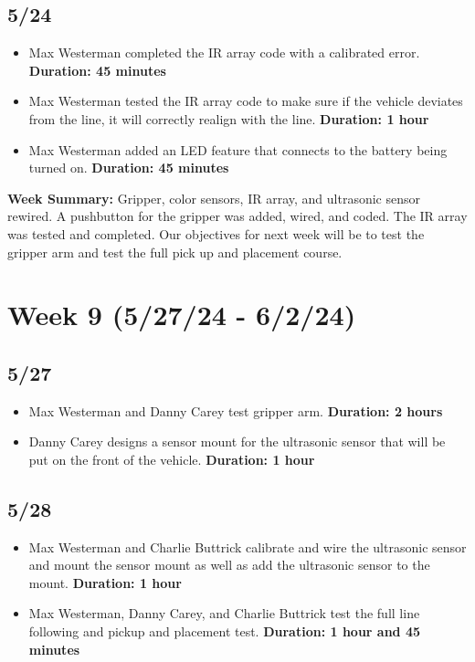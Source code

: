 \documentclass[12pt]{report}
\begin{document}
\subsection*{5/24}

\begin{itemize}
    \item Max Westerman completed the \gls{IR} array code with a calibrated error. \textbf{Duration: 45 minutes}
    \item Max Westerman tested the \gls{IR} array code to make sure if the vehicle deviates from the line, it will correctly realign with the line. \textbf{Duration: 1 hour}
    \item Max Westerman added an \gls{LED} feature that connects to the battery being turned on. \textbf{Duration: 45 minutes}
\end{itemize}

\textbf{Week Summary:} Gripper, color sensors, \gls{IR} array, and ultrasonic sensor rewired. A pushbutton for the gripper was added, wired, and coded. The \gls{IR} array was tested and completed. Our objectives for next week will be to test the gripper arm and test the full pick up and placement course.

\section{Week 9 (5/27/24 - 6/2/24)}
\subsection*{5/27}

\begin{itemize}
    \item Max Westerman and Danny Carey test gripper arm. \textbf{Duration: 2 hours}
    \item Danny Carey designs a sensor mount for the ultrasonic sensor that will be put on the front of the vehicle. \textbf{Duration: 1 hour}
\end{itemize}

\subsection*{5/28}

\begin{itemize}
    \item Max Westerman and Charlie Buttrick calibrate and wire the ultrasonic sensor and mount the sensor mount as well as add the ultrasonic sensor to the mount. \textbf{Duration: 1 hour}
    \item Max Westerman, Danny Carey, and Charlie Buttrick test the full line following and pickup and placement test. \textbf{Duration: 1 hour and 45 minutes}
\end{itemize}
\end{document}
